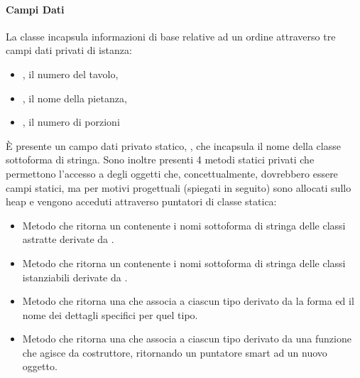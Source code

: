 \paragraph{Campi Dati} %
\label{par:campi_dati}
La classe  incapsula informazioni di base relative ad un ordine attraverso tre campi dati privati di istanza:
\begin{itemize}
	\item {}, il numero del tavolo,
	\item {}, il nome della pietanza,
	\item {}, il numero di porzioni
\end{itemize}
È presente un campo dati privato statico, , che incapsula il nome della classe sottoforma di stringa. Sono inoltre presenti 4 metodi statici privati che permettono l'accesso a degli oggetti che, concettualmente, dovrebbero essere campi statici, ma per motivi progettuali (spiegati in seguito) sono allocati sullo heap e vengono acceduti attraverso puntatori di classe statica:
\begin{itemize}
	\item {}\newline
	Metodo che ritorna un  contenente i nomi sottoforma di stringa delle classi astratte derivate da .
	\item {}\newline
	Metodo che ritorna un  contenente i nomi sottoforma di stringa delle classi istanziabili derivate da .
	\item {}\newline
	Metodo che ritorna una  che associa a ciascun tipo derivato da  la forma ed il nome dei dettagli specifici per quel tipo.
	\item {}\newline
	\newline
	Metodo che ritorna una  che associa a ciascun tipo derivato da  una funzione che agisce da costruttore, ritornando un puntatore smart ad un nuovo oggetto.
\end{itemize}

